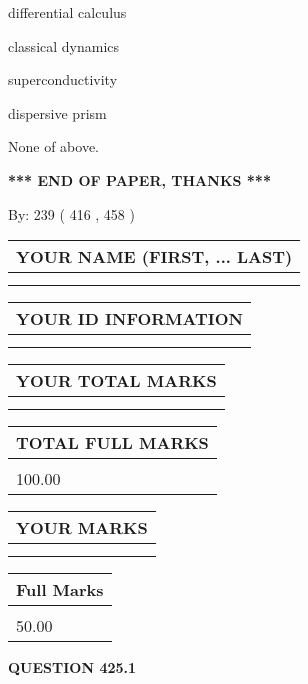 \documentclass[12pt]{article}
\begin{document}
 
differential calculus
 
 
classical dynamics
 
 
superconductivity
 
 
dispersive prism
 
 
 None of above.
 
 
   
   
\vspace{1.0in} 
{\textbf{\large{ *** END OF PAPER, THANKS *** }}} 
   
   
\hspace{1.0in} By: 
 239 ( 416 ,  458 )
   
   
   
   
\newpage 
\setcounter{page}{ 
   425001 } 
   
   
   
   
\noindent\begin{tabular}{|l|}
\hline
YOUR NAME (FIRST, ... LAST)  \\
\hline
 \\ 
 \\ 
\hline
\end{tabular}
\hspace{0.05in} \begin{tabular}{|l|}
\hline
 YOUR   ID   INFORMATION  \\
\hline
 \\ 
 \\ 
\hline
\end{tabular}
   
   
\vspace{0.2in}\noindent\begin{tabular}{|l|}
\hline
YOUR TOTAL MARKS  \\
\hline
 \\ 
 \\ 
\hline
\end{tabular}
\hspace{0.05in} \begin{tabular}{|l|}
\hline
TOTAL FULL MARKS  \\
\hline
 \\ 
100.00 \\
\hline
\end{tabular}
  
\vspace{0.2in}
  
\noindent\begin{tabular}{|l|}
\hline
 YOUR MARKS  \\
\hline
 \\ 
 \\ 
\hline
\end{tabular}
\hspace{0.05in} \begin{tabular}{|l|}
\hline
 Full Marks  \\
\hline
 \\ 
50.00 \\
\hline
\end{tabular}
{\textbf{\Large{QUESTION
425.1 
}}}
  
\end{document}
